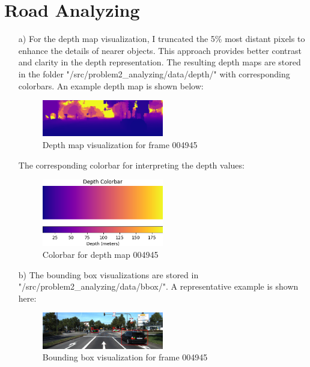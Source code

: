 \documentclass[]{article}
\begin{document}
\section{Road Analyzing}
\begin{enumerate}
	\item[a)] For the depth map visualization, I truncated the 5\% most distant pixels to enhance the details of nearer objects. This approach provides better contrast and clarity in the depth representation.
		The resulting depth maps are stored in the folder "/src/problem2\_analyzing/data/depth/" with corresponding colorbars. An example depth map is shown below:
		\begin{figure}[h]
			\centering
			\includegraphics[width=0.5\textwidth]{src/problem2_analyzing/data/depth/004945_depth.png}
			\caption{Depth map visualization for frame 004945}
			\label{fig:depth_map_example}
		\end{figure}
		\newpage
		The corresponding colorbar for interpreting the depth values:
		\begin{figure}[h]
			\centering
			\includegraphics[width=0.5\textwidth]{src/problem2_analyzing/data/depth/004945_colorbar.png}
			\caption{Colorbar for depth map 004945}
			\label{fig:colorbar}
		\end{figure}
		
	\item[b)] The bounding box visualizations are stored in "/src/problem2\_analyzing/data/bbox/". A representative example is shown here:
		\begin{figure}[h]
			\centering
			\includegraphics[width=0.5\textwidth]{src/problem2_analyzing/data/bbox/004945_bbox.png}
			\caption{Bounding box visualization for frame 004945}
			\label{fig:bbox_visualization}
		\end{figure}
		

\end{enumerate}
\end{document}
